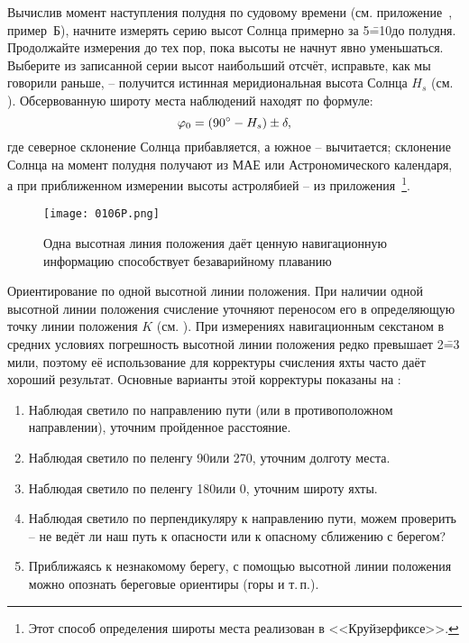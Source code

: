 Вычислив момент наступления полудня по судовому
времени (см. приложение~, пример~Б), начните измерять серию
высот Солнца примерно за 5\==10\tmin до полудня. Продолжайте измерения
до тех пор, пока высоты не начнут явно уменьшаться. Выберите из
записанной серии высот наибольший отсчёт, исправьте, как мы говорили
раньше, \--- получится истинная меридиональная высота Солнца
$H_s$ (см. ). Обсервованную широту места наблюдений находят по формуле:
%
\begin{equation}
  \label{eq:75}
  \varphi_0 = (90^\circ - H_s) \pm \delta,
\end{equation}
% 
где северное склонение Солнца прибавляется, а южное \--- вычитается;
склонение Солнца на момент полудня получают из МАЕ или
Астрономического календаря, а при приближенном измерении высоты
астролябией \--- из приложения~\footnote{Этот способ
  определения широты места реализован в <<Круйзерфиксе>>.}.

\begin{figure*}[!htb]
  \centering
  \texttt{[image: 0106P.png]}
  \caption[Одна высотная линия положения]{Одна высотная линия положения даёт ценную навигационную информацию способствует безаварийному плаванию}
  \label{fig:106}
\end{figure*}

Ориентирование по одной высотной линии положения. При наличии одной
высотной линии положения счисление уточняют переносом его в
определяющую точку линии положения $K$ (см. ). При измерениях
навигационным секстаном в средних условиях погрешность высотной линии
положения редко превышает 2\==3 мили, поэтому её использование для
корректуры счисления яхты часто даёт хороший результат. Основные
варианты этой корректуры показаны на :

\begin{enumerate}
\item Наблюдая светило по направлению пути (или в противоположном
  направлении), уточним пройденное расстояние.
\item Наблюдая светило по пеленгу 90\gr или 270\gr, уточним долготу
  места.
\item Наблюдая светило по пеленгу 180\gr или 0\gr, уточним широту
  яхты.
\item Наблюдая светило по перпендикуляру к направлению пути, можем
  проверить \--- не ведёт ли наш путь к опасности или к опасному сближению
  с берегом?
\item Приближаясь к незнакомому берегу, с помощью высотной линии
  положения можно опознать береговые ориентиры (горы и т.\,п.).
\end{enumerate}


